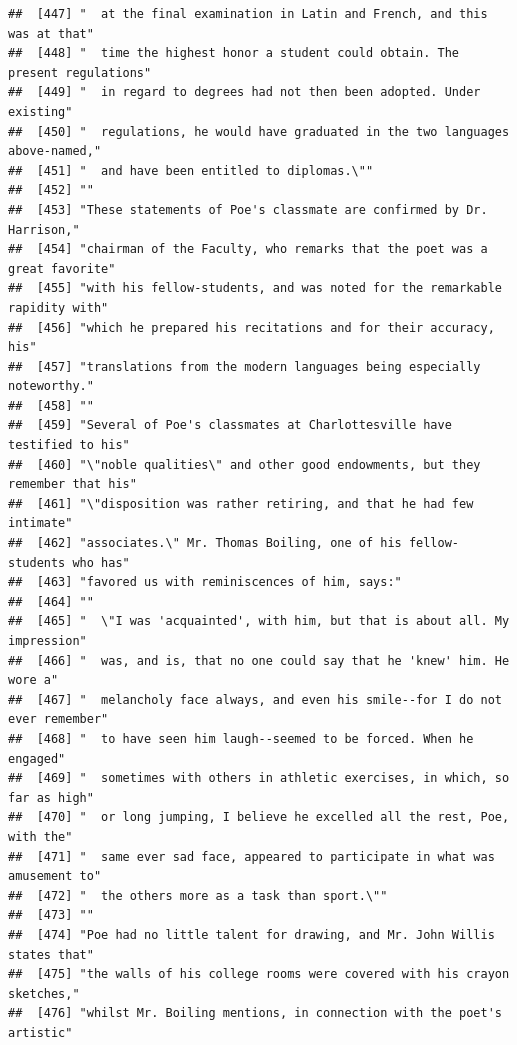 \documentclass{article}\usepackage[]{graphicx}\usepackage[]{color}
\makeatletter
\newenvironment{kframe}{%
 \def\at@end@of@kframe{}%
 \ifinner\ifhmode%
  \def\at@end@of@kframe{\end{minipage}}%
  \begin{minipage}{\columnwidth}%
 \fi\fi%
 \def\FrameCommand##1{\hskip\@totalleftmargin \hskip-\fboxsep
 \colorbox{shadecolor}{##1}\hskip-\fboxsep
     \hskip-\linewidth \hskip-\@totalleftmargin \hskip\columnwidth}%
 \MakeFramed {\advance\hsize-\width
   \@totalleftmargin\z@ \linewidth\hsize
   \@setminipage}}%
 {\par\unskip\endMakeFramed%
 \at@end@of@kframe}
\newenvironment{knitrout}{}{} %
\makeatother
\begin{document}
\begin{knitrout}
\begin{kframe}
\begin{verbatim}
##  [447] "  at the final examination in Latin and French, and this was at that"        
##  [448] "  time the highest honor a student could obtain. The present regulations"    
##  [449] "  in regard to degrees had not then been adopted. Under existing"            
##  [450] "  regulations, he would have graduated in the two languages above-named,"    
##  [451] "  and have been entitled to diplomas.\""                                     
##  [452] ""                                                                            
##  [453] "These statements of Poe's classmate are confirmed by Dr. Harrison,"          
##  [454] "chairman of the Faculty, who remarks that the poet was a great favorite"     
##  [455] "with his fellow-students, and was noted for the remarkable rapidity with"    
##  [456] "which he prepared his recitations and for their accuracy, his"               
##  [457] "translations from the modern languages being especially noteworthy."         
##  [458] ""                                                                            
##  [459] "Several of Poe's classmates at Charlottesville have testified to his"        
##  [460] "\"noble qualities\" and other good endowments, but they remember that his"   
##  [461] "\"disposition was rather retiring, and that he had few intimate"             
##  [462] "associates.\" Mr. Thomas Boiling, one of his fellow-students who has"        
##  [463] "favored us with reminiscences of him, says:"                                 
##  [464] ""                                                                            
##  [465] "  \"I was 'acquainted', with him, but that is about all. My impression"      
##  [466] "  was, and is, that no one could say that he 'knew' him. He wore a"          
##  [467] "  melancholy face always, and even his smile--for I do not ever remember"    
##  [468] "  to have seen him laugh--seemed to be forced. When he engaged"              
##  [469] "  sometimes with others in athletic exercises, in which, so far as high"     
##  [470] "  or long jumping, I believe he excelled all the rest, Poe, with the"        
##  [471] "  same ever sad face, appeared to participate in what was amusement to"      
##  [472] "  the others more as a task than sport.\""                                   
##  [473] ""                                                                            
##  [474] "Poe had no little talent for drawing, and Mr. John Willis states that"       
##  [475] "the walls of his college rooms were covered with his crayon sketches,"       
##  [476] "whilst Mr. Boiling mentions, in connection with the poet's artistic"         

\end{verbatim}
\end{kframe}
\end{knitrout}
\end{document}
